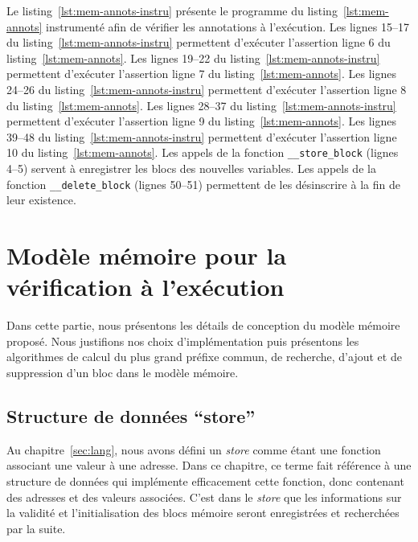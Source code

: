 Le listing~\ref{lst:mem-annots-instru} présente le programme du
listing~\ref{lst:mem-annots} instrumenté afin de vérifier les annotations à
l'exécution.
Les lignes 15--17 du listing~\ref{lst:mem-annots-instru} permettent d'exécuter
l'assertion ligne 6 du listing~\ref{lst:mem-annots}.
Les lignes 19--22 du listing~\ref{lst:mem-annots-instru} permettent d'exécuter
l'assertion ligne 7 du listing~\ref{lst:mem-annots}.
Les lignes 24--26 du listing~\ref{lst:mem-annots-instru} permettent d'exécuter
l'assertion ligne 8 du listing~\ref{lst:mem-annots}.
Les lignes 28--37 du listing~\ref{lst:mem-annots-instru} permettent d'exécuter
l'assertion ligne 9 du listing~\ref{lst:mem-annots}.
Les lignes 39--48 du listing~\ref{lst:mem-annots-instru} permettent d'exécuter
l'assertion ligne 10 du listing~\ref{lst:mem-annots}.
Les appels de la fonction \lstinline'__store_block' (lignes 4--5) servent à
enregistrer les blocs des nouvelles variables.
Les appels de la fonction \lstinline'__delete_block' (lignes 50--51) permettent
de les désinscrire à la fin de leur existence.


\section{Modèle mémoire pour la vérification à l'exécution}
\label{sec:mem-model}


Dans cette partie, nous présentons les détails de conception du modèle mémoire
proposé.
Nous justifions nos choix d'implémentation puis présentons les algorithmes de
calcul du plus grand préfixe commun, de recherche, d'ajout et de suppression
d'un bloc dans le modèle mémoire.


\subsection{Structure de données ``store''}


Au chapitre~\ref{sec:lang}, nous avons défini un {\em store} comme étant une
fonction associant une valeur à une adresse.
Dans ce chapitre, ce terme fait référence à une structure de données qui
implémente efficacement cette fonction, donc contenant des adresses et des
valeurs associées.
C'est dans le {\em store} que les informations sur la validité et
l'initialisation des blocs mémoire seront enregistrées et recherchées par la
suite.

